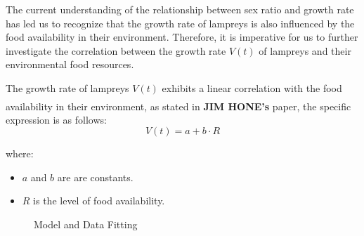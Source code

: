 \documentclass[12pt]{article}  %
\newcommand{\upcite}[1]{\textsuperscript{\textsuperscript{\cite{#1}}}}
\begin{document}
The current understanding of the relationship between sex ratio and growth rate has led us to recognize that the growth rate of lampreys is also influenced by the food availability in their environment.  Therefore, it is imperative for us to further investigate the correlation between the growth rate $V(t)$ of lampreys and their environmental food resources.

The growth rate of lampreys $V(t)$ exhibits a linear correlation with the food availability in their environment, as stated in \textbf{JIM HONE's}\upcite{2} paper, the specific expression is as follows:
\begin{equation}
	V(t)=a+b\cdot R
\end{equation}

where:
\begin{itemize}
	\setlength{\parsep}{0ex} %
	\setlength{\topsep}{2ex} %
	\setlength{\itemsep}{1ex} %
	\item $a$ and $b$ are are constants.
	\item $R$  is the level of food availability.
\end{itemize}
\begin{figure}[H]
	\centering    
	
	\caption{Model and Data Fitting} %
\end{figure}
\end{document}
